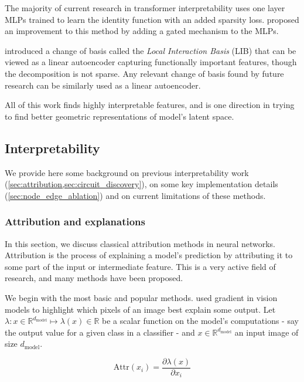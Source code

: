 \documentclass{article}
\newcommand{\R}{\mathbb{R}}
\begin{document}
The majority of current research in transformer interpretability uses one layer MLPs \citep{cunningham2023sparse, gao2024scaling} trained to learn the identity function with an added sparsity loss. \citet{rajamanoharan2024improving} proposed an improvement to this method by adding a gated mechanism to the MLPs.

\citet{bushnaq2024using} introduced a change of basis called the \textit{Local Interaction Basis} (LIB) that can be viewed as a linear autoencoder capturing functionally important features, though the decomposition is not sparse. Any relevant change of basis found by future research can be similarly used as a linear autoencoder.%

All of this work finds highly interpretable features, and is one direction in trying to find better geometric representations of model's latent space.

\subsection{Interpretability}
\label{sec:interpretability}

We provide here some background on previous interpretability work (\cref{sec:attribution,sec:circuit_discovery}), on some key implementation details (\cref{sec:node_edge_ablation}) and on current limitations of these methods.

\subsubsection{Attribution and explanations}
\label{sec:attribution}

In this section, we discuss classical attribution methods in neural networks. Attribution is the process of explaining a model's prediction by attributing it to some part of the input or intermediate feature. This is a very active field of research, and many methods have been proposed.

We begin with the most basic and popular methods. \citet{springenberg2015strivingGuidedBackprop} used gradient in vision models to highlight which pixels of an image best explain some output. Let $\lambda : x \in \R^{d_{\mathrm{model}}} \mapsto \lambda(x) \in \R$ be a scalar function on the model's computations - say the output value for a given class in a classifier - and $x \in \R^{d_{\mathrm{model}}}$ an input image of size $d_{\mathrm{model}}$.

$$ \mathrm{Attr}(x_i) = \frac{\partial \lambda(x)}{\partial x_i} $$
\end{document}

